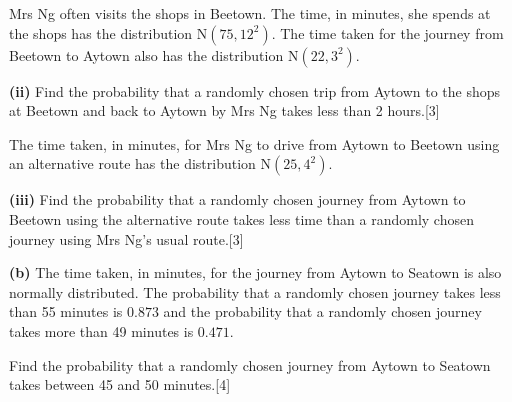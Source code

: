 \documentclass[a4paper,11pt,oneside]{article}
\newcommand{\partlabel}[1]{\par\needspace{3\baselineskip}\smallskip\noindent\textbf{#1}\quad}
\newcommand{\mk}[1]{\hfill[#1]}
\begin{document}
Mrs Ng often visits the shops in Beetown. The time, in minutes, she spends at the shops has the distribution $\mathrm{N}(75,12^2)$. The time taken for the journey from Beetown to Aytown also has the distribution $\mathrm{N}(22,3^2)$.
\partlabel{(ii)}
Find the probability that a randomly chosen trip from Aytown to the shops at Beetown and back to Aytown by Mrs Ng takes less than 2 hours.\mk{3}

The time taken, in minutes, for Mrs Ng to drive from Aytown to Beetown using an alternative route has the distribution $\mathrm{N}(25,4^2)$.
\partlabel{(iii)}
Find the probability that a randomly chosen journey from Aytown to Beetown using the alternative route takes less time than a randomly chosen journey using Mrs Ng's usual route.\mk{3}
\partlabel{(b)}
The time taken, in minutes, for the journey from Aytown to Seatown is also normally distributed. The probability that a randomly chosen journey takes less than 55 minutes is $0.873$ and the probability that a randomly chosen journey takes more than 49 minutes is $0.471$.

Find the probability that a randomly chosen journey from Aytown to Seatown takes between 45 and 50 minutes.\mk{4}
\end{document}
